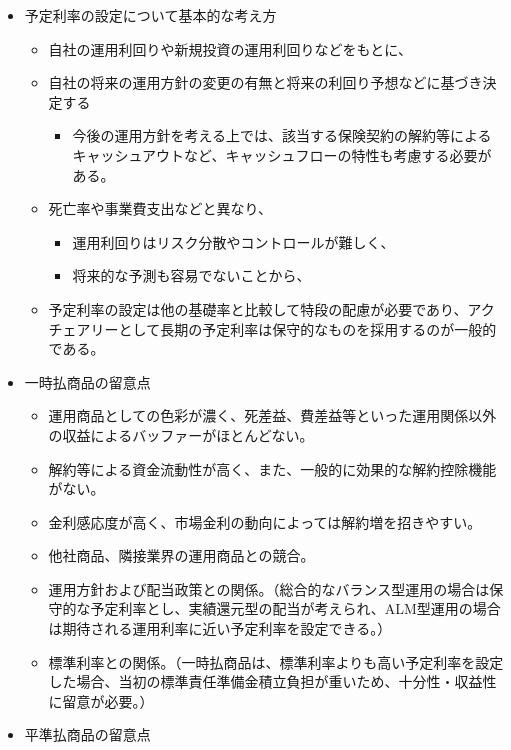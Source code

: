 \documentclass[]{article}
\begin{document}
\begin{itemize}
\tightlist
\item
  予定利率の設定について基本的な考え方

  \begin{itemize}
  \tightlist
  \item
    自社の運用利回りや新規投資の運用利回りなどをもとに、
  \item
    自社の将来の運用方針の変更の有無と将来の利回り予想などに基づき決定する

    \begin{itemize}
    \tightlist
    \item
      今後の運用方針を考える上では、該当する保険契約の解約等によるキャッシュアウトなど、キャッシュフローの特性も考慮する必要がある。
    \end{itemize}
  \item
    死亡率や事業費支出などと異なり、

    \begin{itemize}
    \tightlist
    \item
      運用利回りはリスク分散やコントロールが難しく、
    \item
      将来的な予測も容易でないことから、
    \end{itemize}
  \item
    予定利率の設定は他の基礎率と比較して特段の配慮が必要であり、アクチェアリーとして長期の予定利率は保守的なものを採用するのが一般的である。
  \end{itemize}
\item
  一時払商品の留意点

  \begin{itemize}
  \tightlist
  \item
    運用商品としての色彩が濃く、死差益、費差益等といった運用関係以外の収益によるバッファーがほとんどない。
  \item
    解約等による資金流動性が高く、また、一般的に効果的な解約控除機能がない。
  \item
    金利感応度が高く、市場金利の動向によっては解約増を招きやすい。
  \item
    他社商品、隣接業界の運用商品との競合。
  \item
    運用方針および配当政策との関係。（総合的なバランス型運用の場合は保守的な予定利率とし、実績還元型の配当が考えられ、ALM型運用の場合は期待される運用利率に近い予定利率を設定できる。）
  \item
    標準利率との関係。（一時払商品は、標準利率よりも高い予定利率を設定した場合、当初の標準責任準備金積立負担が重いため、十分性・収益性に留意が必要。）
  \end{itemize}
\item
  平準払商品の留意点


\end{itemize}
\end{document}
